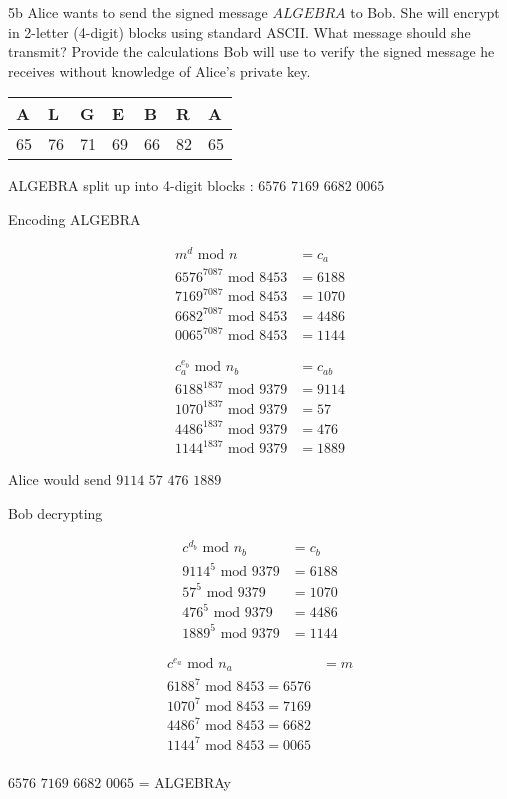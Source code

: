 
\begin{question}{5b}
Alice wants to send the signed message $ALGEBRA$ to Bob. She will encrypt in
2-letter (4-digit) blocks using standard ASCII. What message should she transmit? Provide
the calculations Bob will use to verify the signed message he receives without knowledge of
Alice's private key.
\end{question}

\begin{tabular}{lllllll}
A  & L  & G  & E  & B  & R  & A  \\ 
\hline 
65 & 76 & 71 & 69 & 66 & 82 & 65 
\end{tabular}

ALGEBRA split up into 4-digit blocks : $6576$ $7169$ $6682$ $0065$

Encoding ALGEBRA

\begin{align*}
m^{d} \textrm{ mod } n &= c_a\\
6576^{7087} \textrm{ mod } 8453 &= 6188 \\
7169^{7087} \textrm{ mod } 8453 &= 1070 \\
6682^{7087} \textrm{ mod } 8453 &= 4486 \\
0065^{7087} \textrm{ mod } 8453 &= 1144 
\end{align*}

\begin{align*}
c_a^{e_b} \textrm{ mod } n_b &= c_{ab}\\
6188^{1837} \textrm{ mod } 9379 &= 9114 \\
1070^{1837} \textrm{ mod } 9379 &= 57 \\
4486^{1837} \textrm{ mod } 9379 &= 476 \\
1144^{1837} \textrm{ mod } 9379 &= 1889 
\end{align*}


Alice would send $9114$ $57$ $476$ $1889$

Bob decrypting

\begin{align*}
c^{d_b} \textrm{ mod } n_b &= c_{b}\\
9114	^{5} \textrm{ mod } 9379 &= 6188 \\
57		^{5} \textrm{ mod } 9379 &= 1070 \\
476		^{5} \textrm{ mod } 9379 &= 4486 \\
1889	^{5} \textrm{ mod } 9379 &= 1144
\end{align*}

\begin{align*}
c^{e_a} \textrm{ mod } n_a &= m\\
6188	^{7} \textrm{ mod } 8453 = 6576 \\
1070	^{7} \textrm{ mod } 8453 = 7169 \\
4486	^{7} \textrm{ mod } 8453 = 6682 \\
1144	^{7} \textrm{ mod } 8453 = 0065 \\
\end{align*}

$6576$ $7169$ $6682$ $0065$ = ALGEBRAy

